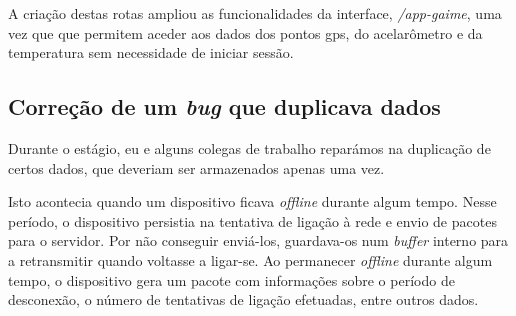 A criação destas rotas ampliou as funcionalidades da interface, \textit{/app-gaime}, uma vez que que permitem aceder aos dados dos pontos \acs{gps}, do acelarômetro e da temperatura sem necessidade de iniciar sessão.

\clearpage
\subsection{Correção de um \textit{bug} que duplicava dados} %



Durante o estágio, eu e alguns colegas de trabalho reparámos na duplicação de certos dados, que deveriam ser armazenados apenas uma vez.

Isto acontecia quando um dispositivo ficava \textit{offline} durante algum tempo. Nesse período, o dispositivo persistia na tentativa de ligação à rede e envio de pacotes para o servidor. Por não conseguir enviá-los, guardava-os num \textit{buffer} interno para a retransmitir quando voltasse a ligar-se. Ao permanecer \textit{offline} durante algum tempo, o dispositivo gera um pacote com informações sobre o período de desconexão, o número de tentativas de ligação efetuadas, entre outros dados.

